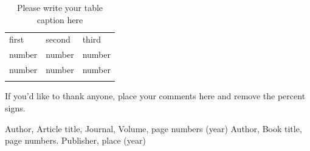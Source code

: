 %
\begin{table}
\caption{Please write your table caption here}
\label{tab:1}       %
\begin{tabular}{lll}
\hline\noalign{\smallskip}
first & second & third  \\
\noalign{\smallskip}\hline\noalign{\smallskip}
number & number & number \\
number & number & number \\
\noalign{\smallskip}\hline
\end{tabular}
\end{table}


\begin{acknowledgements}
If you'd like to thank anyone, place your comments here
and remove the percent signs.
\end{acknowledgements}


\begin{thebibliography}{}
%
%
Author, Article title, Journal, Volume, page numbers (year)
Author, Book title, page numbers. Publisher, place (year)
\end{thebibliography}



